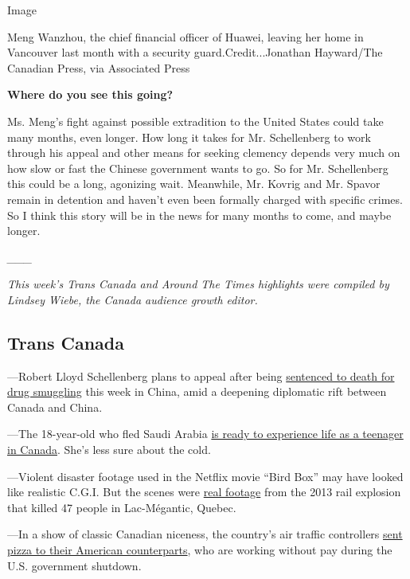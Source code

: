 Image

Meng Wanzhou, the chief financial officer of Huawei, leaving her home in
Vancouver last month with a security guard.Credit...Jonathan Hayward/The
Canadian Press, via Associated Press

\textbf{Where do you see this going?}

Ms. Meng's fight against possible extradition to the United States could
take many months, even longer. How long it takes for Mr. Schellenberg to
work through his appeal and other means for seeking clemency depends
very much on how slow or fast the Chinese government wants to go. So for
Mr. Schellenberg this could be a long, agonizing wait. Meanwhile, Mr.
Kovrig and Mr. Spavor remain in detention and haven't even been formally
charged with specific crimes. So I think this story will be in the news
for many months to come, and maybe longer.

\emph{\_\_\_}

\emph{This week's Trans Canada and Around The Times highlights were
compiled by Lindsey Wiebe, the Canada audience growth editor.}

\hypertarget{trans-canada}{%
\subsection{Trans Canada}\label{trans-canada}}

---Robert Lloyd Schellenberg plans to appeal after being
\href{https://www.nytimes.com/2019/01/14/world/asia/china-canada-schellenberg-retrial.html?module=inline}{sentenced
to death for drug smuggling} this week in China, amid a deepening
diplomatic rift between Canada and China.

---The 18-year-old who fled Saudi Arabia
\href{https://www.nytimes.com/2019/01/14/world/canada/rahaf-mohammed-alqunun-interview.html}{is
ready to experience life as a teenager in Canada}. She's less sure about
the cold.

---Violent disaster footage used in the Netflix movie ``Bird Box'' may
have looked like realistic C.G.I. But the scenes were
\href{https://www.nytimes.com/2019/01/17/arts/television/bird-box-netflix-explosion.html}{real
footage} from the 2013 rail explosion that killed 47 people in
Lac-Mégantic, Quebec.

---In a show of classic Canadian niceness, the country's air traffic
controllers
\href{https://www.nytimes.com/2019/01/14/world/canada/shutdown-air-traffic-controllers-pizza.html}{sent
pizza to their American counterparts}, who are working without pay
during the U.S. government shutdown.

